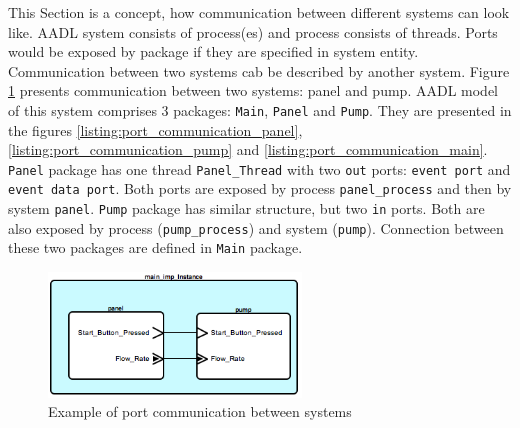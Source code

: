 This Section is a concept, how communication between different systems can look like. AADL system consists of process(es) and process consists of threads. Ports would be exposed by package if they are specified in system entity. Communication between two systems cab be described by another system. Figure \ref{figure:port_communication} presents communication between two systems: panel and pump. AADL model of this system comprises 3 packages: \lstinline{Main}, \lstinline{Panel} and \lstinline{Pump}. They are presented in the figures \ref{listing:port_communication_panel}, \ref{listing:port_communication_pump} and \ref{listing:port_communication_main}. \lstinline{Panel} package has one thread \lstinline{Panel_Thread} with two \lstinline{out} ports: \lstinline{event port} and \lstinline{event data port}. Both ports are exposed by process \lstinline{panel_process} and then by system \lstinline{panel}. \lstinline{Pump} package has similar structure, but two \lstinline{in} ports. Both are also exposed by process (\lstinline{pump_process}) and system (\lstinline{pump}). Connection between these two packages are defined in \lstinline{Main} package.

\begin{figure}%
    \begin{center}
    	\includegraphics[width=0.6\textwidth]{figures/port-communication.png}    	
    \end{center}
    \caption{Example of port communication between systems}
    \label{figure:port_communication}
\end{figure}

